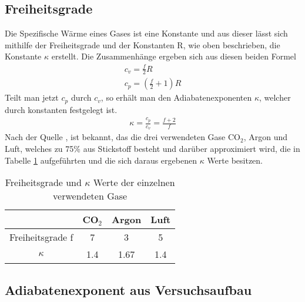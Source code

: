 \documentclass[12pt,a4paper,titlepage,headinclude,bibtotoc]{scrartcl}
\begin{document}
\subsection{Freiheitsgrade}
Die Spezifische Wärme eines Gases ist eine Konstante und aus dieser lässt sich mithilfe der Freiheitsgrade und der Konstanten R, wie oben beschrieben, die Konstante $\kappa$ erstellt.
Die Zusammenhänge ergeben sich aus diesen beiden Formel %
\begin{align}
	c_v=\frac{f}{2}R\\
	c_p=\left(\frac{f}{2}+1\right)R
\end{align}
Teilt man jetzt $c_p$ durch $c_v$, so erhält man den Adiabatenexponenten $\kappa$, welcher durch konstanten festgelegt ist.
\begin{align}
	\kappa=\frac{c_p}{c_v}=\frac{f+2}{f}
\end{align}
Nach der Quelle %
, ist bekannt, das die drei verwendeten Gase CO$_2$, Argon und Luft, welches zu 75\% aus Stickstoff besteht und darüber approximiert wird, die in Tabelle \ref{tab:kappafrei} aufgeführten und die sich daraus ergebenen $\kappa$ Werte besitzen.
\begin{table}[!h]
\centering
\begin{tabular}{|c|c|c|c|}
	\hline
				& CO$_2$	& Argon		& Luft\\
	\hline\hline
	Freiheitsgrade f	& 7		& 3		& 5\\
	$\kappa$		& 1.4		& 1.67		& 1.4\\
	\hline
\end{tabular}
\caption{Freiheitsgrade und $\kappa$ Werte der einzelnen verwendeten Gase}
\label{tab:kappafrei}
\end{table}

\subsection{Adiabatenexponent aus Versuchsaufbau}
\end{document}
